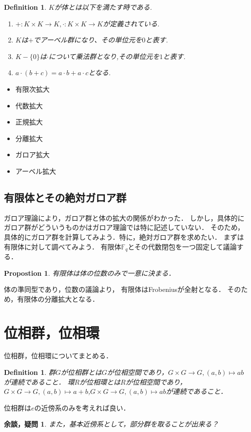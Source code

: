 \documentclass{ujarticle}
\newtheorem{dfn}[thm]{Definition}
\newtheorem{prop}[thm]{Propostion}
\newtheorem*{yodan}{余談，疑問}
\begin{document}
\begin{dfn}
$K$が体とは以下を満たす時である.
\begin{enumerate}
  \setlength{\parskip}{0cm} %
  \setlength{\itemsep}{0cm} %
  \item $ + :K \times K \to K, \cdot : K \times K \to K$が定義されている.
  \item $K$は$+$でアーベル群になり、その単位元を$0$と表す.
  \item $K - \{ 0 \}$は$  \cdot   $について乗法群となり,その単位元を$1$と表す.
  \item $a \cdot (b + c) = a \cdot b + a \cdot c $となる.
\end{enumerate}
\end{dfn}













\begin{itemize}
  \item 有限次拡大
  \item 代数拡大
  \item 正規拡大
  \item 分離拡大
  \item ガロア拡大
  \item アーベル拡大
\end{itemize}

\subsection{有限体とその絶対ガロア群}
\label{sub:有限体とその絶対ガロア群}
ガロア理論により，ガロア群と体の拡大の関係がわかった．
しかし，具体的にガロア群がどういうものかはガロア理論では特に記述していない．
そのため，具体的にガロア群を計算してみよう．特に，絶対ガロア群を求めたい．
まずは有限体に対して調べてみよう．
有限体$\mathbb{F}_q$とその代数閉包を一つ固定して議論する．
\begin{prop}
  有限体は体の位数のみで一意に決まる．
\end{prop}

体の準同型であり，位数の議論より，
有限体はFrobeniusが全射となる．
そのため，有限体の分離拡大となる．

\appendix
\section{位相群，位相環}
位相群，位相環についてまとめる．
\begin{dfn}
 群$G$が位相群とは$G$が位相空間であり，$G \times G \to G,(a,b)\mapsto ab$が連続であること．
 環$R$が位相環とは$R$が位相空間であり，$G \times G \to G,(a,b)\mapsto a+b$,$G\times G \to G,
 (a,b) \mapsto ab$が連続であること．
\end{dfn}
位相群は$e$の近傍系のみを考えれば良い．
\begin{yodan}
  また，基本近傍系として，部分群を取ることが出来る？
\end{yodan}
\end{document}
